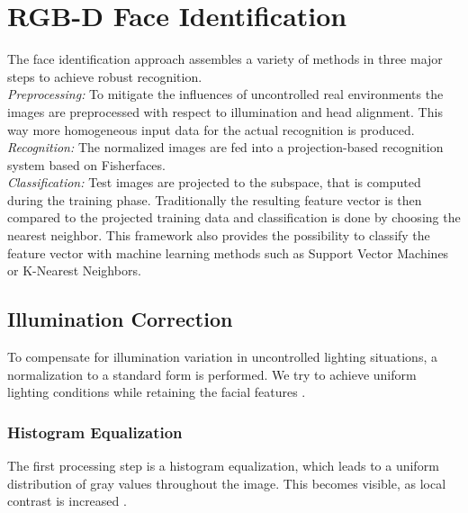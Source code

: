 \section{RGB-D Face Identification}
\label{chap:methods:sec:identification}
The face identification approach assembles a variety of methods in three major steps to achieve robust recognition. \\
\emph{Preprocessing:}
To mitigate the influences of uncontrolled real environments the images are preprocessed with respect to illumination and head alignment. 
This way more homogeneous input data for the actual recognition is produced. \\
	\emph{Recognition:} 
The normalized images are fed into a projection-based recognition system based on Fisherfaces. \\
	\emph{Classification:}
Test images are projected to the subspace, that is computed during the training phase.
Traditionally the resulting feature vector is then compared to the projected training data and classification is done by choosing the nearest neighbor.
This framework also provides the possibility to classify the feature vector with machine learning methods such as Support Vector Machines or K-Nearest Neighbors.

\subsection{Illumination Correction}
\label{chap:methods:subsec:illumination}
To compensate for illumination variation in uncontrolled lighting situations, a normalization to a standard form is performed.
We try to achieve uniform lighting conditions while retaining the facial features \cite{chen06}.
\subsubsection{Histogram Equalization}
The first processing step is a histogram equalization, which leads to a uniform distribution of
gray values throughout the image.
This becomes visible, as local contrast is increased \cite{Goel11}.
\todo{}

